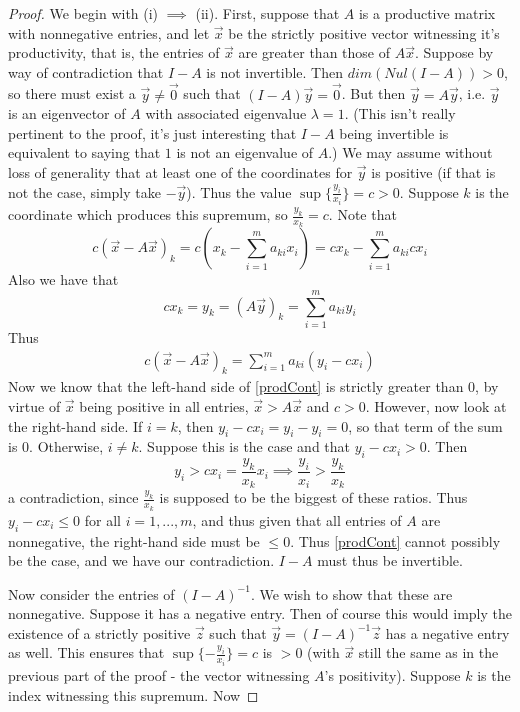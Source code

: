\begin{proof}
	We begin with (i) $\implies$ (ii). First, suppose that $A$ is a productive matrix with nonnegative entries, and let $\vec{x}$ be the strictly positive vector witnessing it's productivity, that is, the entries of $\vec{x}$ are greater than those of $A\vec{x}$. Suppose by way of contradiction that $I-A$ is not invertible. Then $dim(Nul(I-A)) > 0$, so there must exist a $\vec{y} \neq \vec{0}$ such that $(I-A)\vec{y} = \vec{0}$. But then $\vec{y} = A\vec{y}$, i.e. $\vec{y}$ is an eigenvector of $A$ with associated eigenvalue $\lambda = 1$. (This isn't really pertinent to the proof, it's just interesting that $I-A$ being invertible is equivalent to saying that $1$ is not an eigenvalue of $A$.) We may assume without loss of generality that at least one of the coordinates for $\vec{y}$ is positive (if that is not the case, simply take $-\vec{y}$). Thus the value $\sup\{\frac{y_i}{x_i}\} = c > 0$. Suppose $k$ is the coordinate which produces this supremum, so $\frac{y_k}{x_k} = c$. Note that
	\[ c(\vec{x} - A\vec{x})_k = c(x_k-\sum_{i=1}^ma_{ki}x_i) = cx_k - \sum_{i=1}^ma_{ki}cx_i \]
Also we have that
	\[cx_k = y_k = (A\vec{y})_k = \sum_{i=1}^m a_{ki}y_i  \]
Thus 
\begin{align}
	c(\vec{x} - A\vec{x})_k = \sum_{i=1}^m a_{ki}(y_i - cx_i) \label{prodCont}
\end{align} 
Now we know that the left-hand side of \ref{prodCont} is strictly greater than $0$, by virtue of $\vec{x}$ being positive in all entries, $\vec{x} > A\vec{x}$ and $c > 0$. However, now look at the right-hand side. If $i=k$, then $y_i-cx_i = y_i-y_i = 0$, so that term of the sum is $0$. Otherwise, $i \neq k$. Suppose this is the case and that $y_i - cx_i > 0$. Then 
\[  y_i > cx_i = \frac{y_k}{x_k}x_i \implies \frac{y_i}{x_i} > \frac{y_k}{x_k} \]
a contradiction, since $\frac{y_k}{x_k}$ is supposed to be the biggest of these ratios. Thus $y_i - cx_i \leq 0$ for all $i = 1,...,m$, and thus given that all entries of $A$ are nonnegative, the right-hand side must be $\leq 0$. Thus \ref{prodCont} cannot possibly be the case, and we have our contradiction. $I-A$ must thus be invertible. \par 
Now consider the entries of $(I-A)^{-1}$. We wish to show that these are nonnegative. Suppose it has a negative entry. Then of course this would imply the existence of a strictly positive $\vec{z}$ such that $\vec{y}=(I-A)^{-1}\vec{z}$ has a negative entry as well. This ensures that $\sup\{-\frac{y_i}{x_i}\} = c$ is $> 0$ (with $\vec{x}$ still the same as in the previous part of the proof - the vector witnessing $A$'s positivity). Suppose $k$ is the index witnessing this supremum. Now 

\end{proof}
